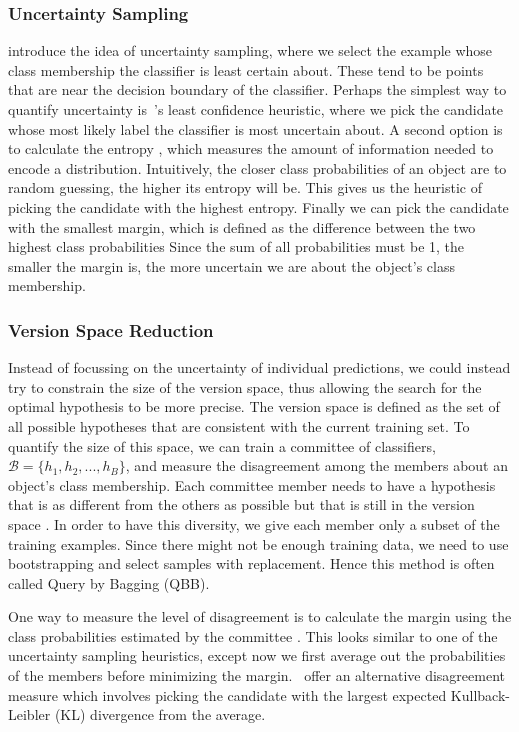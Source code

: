 \documentclass[fleqn,10pt,lineno]{wlpeerj} %
\newcommand{\B}{\mathcal{B}}
\begin{document}
\subsubsection*{Uncertainty Sampling}

\cite{lewis94} introduce the idea of uncertainty sampling, where we select the
example whose class membership the classifier is least certain about. These
tend to be points that are near the decision boundary of the classifier.
Perhaps the simplest way to quantify uncertainty is~\cite{culotta05}'s least
confidence heuristic, where we pick the candidate whose most likely label the
classifier is most uncertain about. A second option is to calculate the entropy
\citep{shannon48}, which measures the amount of information needed to encode a
distribution. Intuitively, the closer class probabilities of an object are to
random guessing, the higher its entropy will be. This gives us the heuristic of
picking the candidate with the highest entropy. Finally we can pick the
candidate with the smallest margin, which is defined as the difference
between the two highest class probabilities \citep{scheffer01} Since the sum of
all probabilities must be 1, the smaller the margin is, the more uncertain we
are about the object's class membership.

\subsubsection*{Version Space Reduction}

Instead of focussing on the uncertainty of individual predictions, we could
instead try to constrain the size of the version space, thus allowing the
search for the optimal hypothesis to be more precise. The version space is
defined as the set of all possible hypotheses that are consistent with the
current training set. To quantify the size of this space, we can train a
committee of classifiers, $\B = \{h_1, h_2, ..., h_B\}$, and measure the
disagreement among the members about an object's class membership. Each
committee member needs to have a hypothesis that is as different from the
others as possible but that is still in the version space \citep{melville04}.
In order to have this diversity, we give each member only a subset of the
training examples. Since there might not be enough training data, we need to
use bootstrapping and select samples with replacement. Hence this method is
often called Query by Bagging (QBB).

One way to measure the level of disagreement is to calculate the margin using
the class probabilities estimated by the committee \citep{melville04}. This
looks similar to one of the uncertainty sampling heuristics, except now we
first average out the probabilities of the members before minimizing the
margin.~\cite{mccallum98} offer an alternative disagreement measure which
involves picking the candidate with the largest expected Kullback-Leibler (KL)
divergence from the average.
\end{document}
